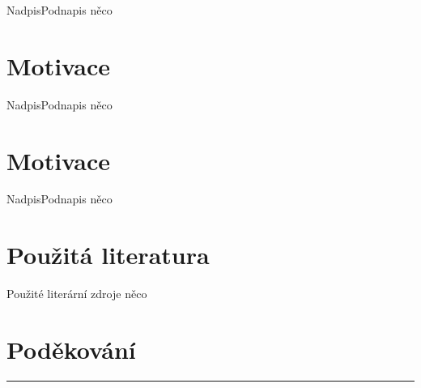 \documentclass[aspectratio=169,28pt]{beamer}
\begin{document}
\begin{frame}{Nadpis}{Podnapis}
		něco
\end{frame}

\section{Motivace}

\begin{frame}{Nadpis}{Podnapis}
		něco
\end{frame}

\section{Motivace}

\begin{frame}{Nadpis}{Podnapis}
		něco
\end{frame}

\section{Použitá literatura}

\begin{frame}{Použité literární zdroje}
		něco
\end{frame}

\section{Poděkování}

\begin{frame}
		\Huge{}
		\vskip 15pt
		{\color{blue}\rule[2pt]{0.8\textwidth}{2pt}}
		\color{black}\vskip 15pt
		\LARGE{}
\end{frame}
\end{document}
